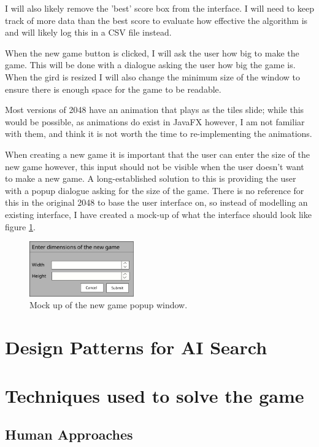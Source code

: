 \documentclass{article}
\begin{document}
I will also likely remove the 'best' score box from the interface. I will need to keep track of more data than the best score to evaluate how effective the algorithm is and will likely log this in a CSV file instead.

When the new game button is clicked, I will ask the user how big to make the game. This will be done with a dialogue asking the user how big the game is. When the gird is resized I will also change the minimum size of the window to ensure there is enough space for the game to be readable.

Most versions of 2048 have an animation that plays as the tiles slide; while this would be possible, as animations do exist in JavaFX \cite{javadocfx} however, I am not familiar with them, and think it is not worth the time to re-implementing the animations.

When creating a new game it is important that the user can enter the size of the new game however, this input should not be visible when the user doesn't want to make a new game. A long-established solution to this
is providing the user with a popup dialogue asking for the size of the game. There is no reference for this in the original 2048 to base the user interface on, so instead of modelling an existing interface, I have created a mock-up of what the interface should look like figure \ref{fig:popup}.

\begin{figure}
    \centering
    \includegraphics[width=0.4\textwidth]{newGamePopup.png}
    \caption{Mock up of the new game popup window.}
    \label{fig:popup}
\end{figure}
\section{Design Patterns for AI Search}
\label{sec:dp}

\section{Techniques used to solve the game}
\label{sec:techniques}

\subsection{Human Approaches}
\end{document}
